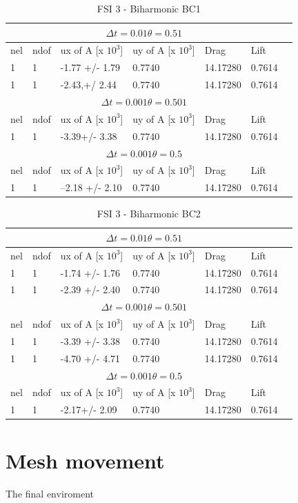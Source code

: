 \begin{table}[h!]
\centering
\caption{FSI 3 - Biharmonic BC1}
\label{my-label}
\begin{tabular}{ |p{1cm}||p{1cm}|p{2.5cm}|p{2.3cm}|p{2.3cm}|p{1.2cm}|p{1.2cm}|}
 \hline
  \multicolumn{6}{|c|}{$\Delta t = 0.01 \theta = 0.51$} \\
   \hline
nel & ndof & ux of A [x $10^{3}$]  &uy of A [x $10^{3}$]& Drag  & Lift \\
 \hline
1 &1 & -1.77 +/- 1.79  &  0.7740  & 14.17280  &  0.7614 \\
1 &1 & -2.43,+/  2.44  &  0.7740  & 14.17280  &  0.7614 \\
 \hline
  \multicolumn{6}{|c|}{$\Delta t = 0.001 \theta = 0.501$} \\
   \hline
 nel & ndof & ux of A [x $10^{3}$]  &uy of A [x $10^{3}$]& Drag  & Lift \\
 1 &1 & -3.39+/-  3.38 &  0.7740  & 14.17280  &  0.7614 \\
\hline
\multicolumn{6}{|c|}{$\Delta t = 0.001 \theta = 0.5$} \\
   \hline
 nel & ndof & ux of A [x $10^{3}$]  &uy of A [x $10^{3}$]& Drag  & Lift \\
\hline
1 &1 &--2.18  +/- 2.10 &  0.7740  & 14.17280  &  0.7614 \\
\end{tabular}
\end{table}

\begin{table}[h!]
\centering
\caption{FSI 3 - Biharmonic BC2}
\label{my-label}
\begin{tabular}{ |p{1cm}||p{1cm}|p{2.3cm}|p{2.3cm}|p{2.3cm}|p{1.2cm}|p{1.2cm}|}
 \hline
  \multicolumn{6}{|c|}{$\Delta t = 0.01 \theta = 0.51$} \\
   \hline
nel & ndof & ux of A [x $10^{3}$]  &uy of A [x $10^{3}$]& Drag  & Lift \\
 \hline
1 &1 & -1.74  +/-  1.76 &  0.7740  & 14.17280  &  0.7614 \\
1 &1 & -2.39   +/-  2.40 &  0.7740  & 14.17280  &  0.7614 \\
 \hline
  \multicolumn{6}{|c|}{$\Delta t = 0.001 \theta = 0.501$} \\
   \hline
 nel & ndof & ux of A [x $10^{3}$]  &uy of A [x $10^{3}$]& Drag  & Lift \\
 1 &1 & -3.39   +/-  3.38 &  0.7740  & 14.17280  &  0.7614 \\
  1 &1 & -4.70  +/-  4.71&  0.7740  & 14.17280  &  0.7614 \\
\hline
\multicolumn{6}{|c|}{$\Delta t = 0.001 \theta = 0.5$} \\
   \hline
 nel & ndof & ux of A [x $10^{3}$]  &uy of A [x $10^{3}$]& Drag  & Lift \\
\hline
1 &1 &-2.17+/-  2.09&  0.7740  & 14.17280  &  0.7614 \\
\end{tabular}
\end{table}


\section{Mesh movement}
The final enviroment 